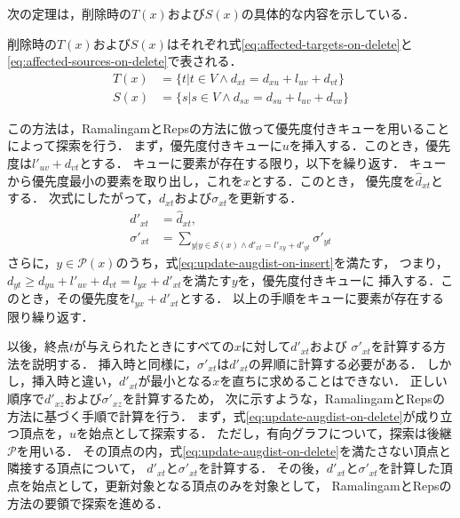 次の定理は，削除時の$T(x)$および$S(x)$の具体的な内容を示している．
\begin{theorem}
  \label{thm:affected-vertices-on-delete}
  削除時の$T(x)$および$S(x)$はそれぞれ式\eqref{eq:affected-targets-on-delete}と
  \eqref{eq:affected-sources-on-delete}で表される．
  \begin{align}
    T(x)&=\{t|t\in V\land d_{xt}=d_{xu}+l_{uv}+d_{vt}\}
    \label{eq:affected-targets-on-delete} \\
    S(x)&=\{s|s\in V\land d_{sx}=d_{su}+l_{uv}+d_{vx}\}
    \label{eq:affected-sources-on-delete}
  \end{align}
\end{theorem}

この方法は，RamalingamとRepsの方法に倣って優先度付きキューを用いることによって探索を行う．
まず，優先度付きキューに$u$を挿入する．このとき，優先度は$l'_{uv}+d_{vt}$とする．
キューに要素が存在する限り，以下を繰り返す．
キューから優先度最小の要素を取り出し，これを$x$とする．このとき，
優先度を$\hat{d}_{xt}$とする．
次式にしたがって，$d_{xt}$および$\sigma_{xt}$を更新する．
\begin{equation*}
  \begin{aligned}
    d'_{xt}&=\hat{d}_{xt},\\
    \sigma'_{xt}&=\sum_{y|y\in\mathcal{S}(x)\land d'_{xt}=l'_{xy}+d'_{yt}}\sigma'_{yt}
  \end{aligned}
\end{equation*}
さらに，$y\in\mathcal{P}(x)$のうち，式\eqref{eq:update-augdist-on-insert}を満たす，
つまり，$d_{yt}\geq d_{yu}+l'_{uv}+d_{vt}=l_{yx}+d'_{xt}$を満たす$y$を，優先度付きキューに
挿入する．このとき，その優先度を$l_{yx}+d'_{xt}$とする．
以上の手順をキューに要素が存在する限り繰り返す．

以後，終点$t$が与えられたときにすべての$x$に対して$d'_{xt}$および
$\sigma'_{xt}$を計算する方法を説明する．
挿入時と同様に，$\sigma'_{xt}$は$d'_{xt}$の昇順に計算する必要がある．
しかし，挿入時と違い，$d'_{xt}$が最小となる$x$を直ちに求めることはできない．
正しい順序で$d'_{xz}$および$\sigma'_{xz}$を計算するため，
次に示すような，RamalingamとRepsの方法に基づく手順で計算を行う．
まず，式\eqref{eq:update-augdist-on-delete}が成り立つ頂点を，$u$を始点として探索する．
ただし，有向グラフについて，探索は後継$\mathcal{P}$を用いる．
その頂点の内，式\eqref{eq:update-augdist-on-delete}を満たさない頂点と隣接する頂点について，
$d'_{xt}$と$\sigma'_{xt}$を計算する．
その後，$d'_{xt}$と$\sigma'_{xt}$を計算した頂点を始点として，更新対象となる頂点のみを対象として，
RamalingamとRepsの方法の要領で探索を進める．

